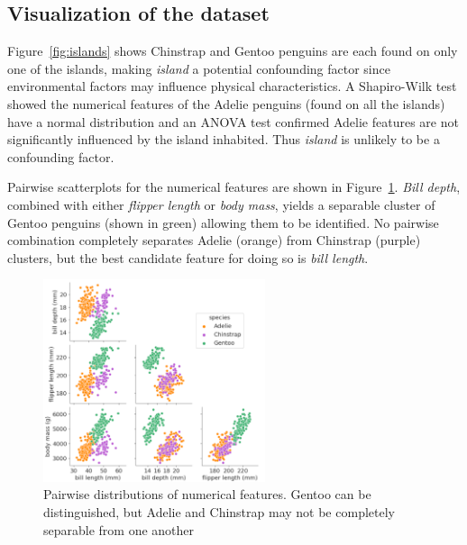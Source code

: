 \documentclass[a4paper, 11pt]{article}
\begin{document}
\subsection*{Visualization of the dataset}

Figure~\ref{fig:islands} shows Chinstrap and Gentoo penguins are each found on only one of the islands, making \textit{island} a potential confounding factor since 
environmental factors may influence physical characteristics. A Shapiro-Wilk test showed  
the numerical features of the Adelie penguins (found on all the islands) have a normal distribution and an ANOVA test confirmed Adelie features are not 
significantly influenced by the island inhabited. Thus \textit{island} is unlikely to be a confounding factor.

Pairwise scatterplots for the numerical features are shown in Figure~\ref{fig:pairwise}. 
\textit{Bill depth}, combined with either \textit{flipper length} or \textit{body mass}, 
yields a separable cluster of Gentoo penguins (shown in green) allowing them to be identified. 
No pairwise combination completely separates Adelie (orange) from Chinstrap (purple) clusters, 
but the best candidate feature for doing so is \textit{bill length}.

\begin{figure} %
  \centering
  \vspace{-1\baselineskip} %
  \includegraphics[width=0.58\textwidth]{pairwise.png} %
  \vspace{-1.5\baselineskip} %
  \caption{\centering\linespread{0.8}\selectfont Pairwise distributions of numerical features. Gentoo can be distinguished, 
  but Adelie and Chinstrap may not be completely separable from one another}
  \vspace{-2.5\baselineskip} %
  \label{fig:pairwise}
\end{figure}
\end{document}
